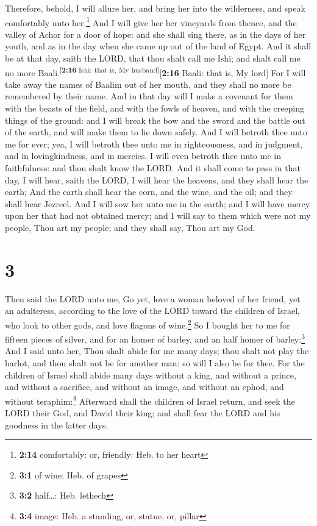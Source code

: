  Therefore, behold, I will allure her, and bring her into
the wilderness, and speak comfortably unto her.\footnote{\textbf{2:14}
  comfortably: or, friendly: Heb. to her heart}  And I
will give her her vineyards from thence, and the valley of Achor for a
door of hope: and she shall sing there, as in the days of her youth, and
as in the day when she came up out of the land of Egypt. 
And it shall be at that day, saith the LORD, that thou shalt call me
Ishi; and shalt call me no more Baali.\textsuperscript{{[}\textbf{2:16}
Ishi: that is, My husband{]}}{[}\textbf{2:16} Baali: that is, My lord{]}
 For I will take away the names of Baalim out of her
mouth, and they shall no more be remembered by their name.
 And in that day will I make a covenant for them with the
beasts of the field, and with the fowls of heaven, and with the creeping
things of the ground: and I will break the bow and the sword and the
battle out of the earth, and will make them to lie down safely.
 And I will betroth thee unto me for ever; yea, I will
betroth thee unto me in righteousness, and in judgment, and in
lovingkindness, and in mercies.  I will even betroth thee
unto me in faithfulness: and thou shalt know the LORD. 
And it shall come to pass in that day, I will hear, saith the LORD, I
will hear the heavens, and they shall hear the earth; 
And the earth shall hear the corn, and the wine, and the oil; and they
shall hear Jezreel.  And I will sow her unto me in the
earth; and I will have mercy upon her that had not obtained mercy; and I
will say to them which were not my people, Thou art my people; and they
shall say, Thou art my God.

\hypertarget{section-2}{%
\section{3}\label{section-2}}

 Then said the LORD unto me, Go yet, love a woman beloved
of her friend, yet an adulteress, according to the love of the LORD
toward the children of Israel, who look to other gods, and love flagons
of wine.\footnote{\textbf{3:1} of wine: Heb. of grapes} 
So I bought her to me for fifteen pieces of silver, and for an homer of
barley, and an half homer of barley:\footnote{\textbf{3:2} half\ldots:
  Heb. lethech}  And I said unto her, Thou shalt abide for
me many days; thou shalt not play the harlot, and thou shalt not be for
another man: so will I also be for thee.  For the children
of Israel shall abide many days without a king, and without a prince,
and without a sacrifice, and without an image, and without an ephod, and
without teraphim:\footnote{\textbf{3:4} image: Heb. a standing, or,
  statue, or, pillar}  Afterward shall the children of
Israel return, and seek the LORD their God, and David their king; and
shall fear the LORD and his goodness in the latter days.

